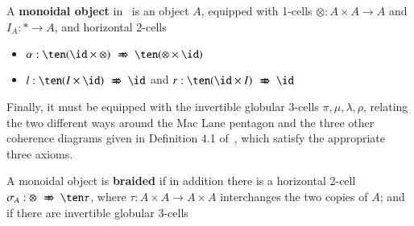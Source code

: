 \begin{defn}
A {\bf monoidal object} in \fB\ is an object $A$, equipped with 1-cells $\otimes: A \times A \rightarrow A$ and $I_A: * \rightarrow A$, and horizontal 2-cells
\begin{itemize} 
\item $\alpha: \ten  (\id \times \tens) \xslashedRightarrow{} \ten (\tens \times \id)$
\item $l: \ten (I \times \id) \xslashedRightarrow{} \id$ and $r:\ten (\id \times I) \xslashedRightarrow{} \id$ 
\end{itemize}
Finally, it must be equipped with the invertible globular 3-cells $\pi, \mu, \lambda, \rho$, relating the two different ways around the Mac Lane pentagon and the three other coherence diagrams given in Definition 4.1 of~\cite{nick:tricatsbook}, which satisfy the appropriate three axioms.

A monoidal object is {\bf braided} if in addition there is a horizontal 2-cell $\sigma_A: \tens \xslashedRightarrow{} \ten \tau$, where $\tau: A \times A \rightarrow A \times A$ interchanges the two copies of $A$; and if there are invertible globular 3-cells 


\end{defn}
